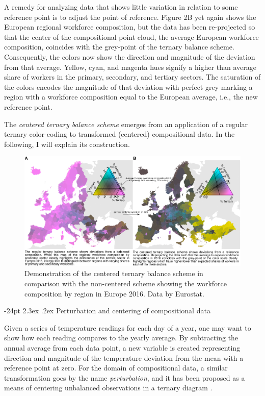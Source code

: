 \documentclass[10pt, twoside, parskip=half]{article}
\makeatletter
\def\maxwidth{\ifdim\Gin@nat@width>\linewidth\linewidth
\else\Gin@nat@width\fi}
\let\Oldincludegraphics\includegraphics
\renewcommand{\includegraphics}[1]{\Oldincludegraphics[width=\maxwidth]{#1}}
\renewcommand\section{\@startsection {section}{1}{\z@}%
                                   {-24pt}%
                                   {2.3ex \@plus.2ex}%
                                   {\normalfont\large\bfseries}}
\makeatother
\begin{document}
A remedy for analyzing data that shows little variation in relation to
some reference point is to adjust the point of reference. Figure 2B yet
again shows the European regional workforce composition, but the data
has been re-projected so that the center of the compositional point
cloud, the average European workforce composition, coincides with the
grey-point of the ternary balance scheme. Consequently, the colors now
show the direction and magnitude of the deviation from that average.
Yellow, cyan, and magenta hues signify a higher than average share of
workers in the primary, secondary, and tertiary sectors. The saturation
of the colors encodes the magnitude of that deviation with perfect grey
marking a region with a workforce composition equal to the European
average, i.e., the new reference point.

The \emph{centered ternary balance scheme} emerges from an application
of a regular ternary color-coding to transformed (centered)
compositional data. In the following, I will explain its construction.

\begin{figure}
\centering
\includegraphics{figure2.png}
\caption{Demonstration of the centered ternary balance scheme in
comparison with the non-centered scheme showing the workforce
composition by region in Europe 2016. Data by Eurostat.}
\end{figure}

\hypertarget{perturbation-and-centering-of-compositional-data}{%
\section{Perturbation and centering of compositional
data}\label{perturbation-and-centering-of-compositional-data}}

Given a series of temperature readings for each day of a year, one may
want to show how each reading compares to the yearly average. By
subtracting the annual average from each data point, a new variable is
created representing direction and magnitude of the temperature
deviation from the mean with a reference point at zero. For the domain
of compositional data, a similar transformation goes by the name
\emph{perturbation}, and it has been proposed as a means of centering
unbalanced observations in a ternary diagram
\citep{VonEynatten2002, PawlowskyGlahn2002}.
\end{document}
